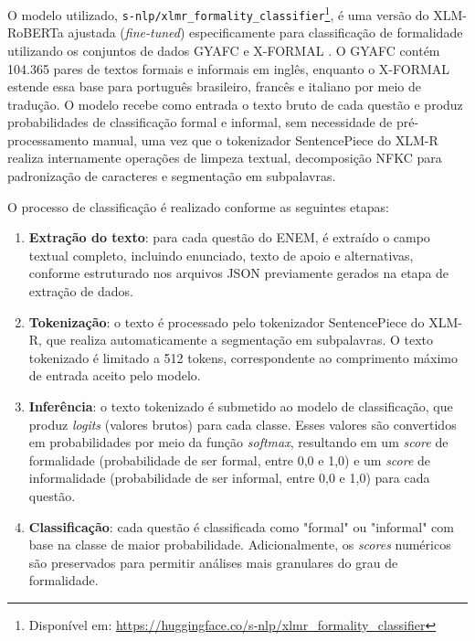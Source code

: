 \documentclass[a4paper,10pt, twocolumn]{article}
\begin{document}
O modelo utilizado, \texttt{s-nlp/xlmr\_formality\_classifier}\footnote{Disponível em: \url{https://huggingface.co/s-nlp/xlmr_formality_classifier}}, é uma versão do XLM-RoBERTa ajustada (\textit{fine-tuned}) especificamente para classificação de formalidade utilizando os conjuntos de dados GYAFC \cite{rao2018dear} e X-FORMAL \cite{briakou2021ola}. O GYAFC contém 104.365 pares de textos formais e informais em inglês, enquanto o X-FORMAL estende essa base para português brasileiro, francês e italiano por meio de tradução. O modelo recebe como entrada o texto bruto de cada questão e produz probabilidades de classificação formal e informal, sem necessidade de pré-processamento manual, uma vez que o tokenizador SentencePiece do XLM-R realiza internamente operações de limpeza textual, decomposição NFKC para padronização de caracteres e segmentação em subpalavras.

O processo de classificação é realizado conforme as seguintes etapas:

\begin{enumerate}
    \item \textbf{Extração do texto}: para cada questão do ENEM, é extraído o campo textual completo, incluindo enunciado, texto de apoio e alternativas, conforme estruturado nos arquivos JSON previamente gerados na etapa de extração de dados.
    
    \item \textbf{Tokenização}: o texto é processado pelo tokenizador SentencePiece do XLM-R, que realiza automaticamente a segmentação em subpalavras. O texto tokenizado é limitado a 512 tokens, correspondente ao comprimento máximo de entrada aceito pelo modelo.
    
    \item \textbf{Inferência}: o texto tokenizado é submetido ao modelo de classificação, que produz \textit{logits} (valores brutos) para cada classe. Esses valores são convertidos em probabilidades por meio da função \textit{softmax}, resultando em um \textit{score} de formalidade (probabilidade de ser formal, entre 0,0 e 1,0) e um \textit{score} de informalidade (probabilidade de ser informal, entre 0,0 e 1,0) para cada questão.
    
    \item \textbf{Classificação}: cada questão é classificada como "formal" ou "informal" com base na classe de maior probabilidade. Adicionalmente, os \textit{scores} numéricos são preservados para permitir análises mais granulares do grau de formalidade.
\end{enumerate}
\end{document}

